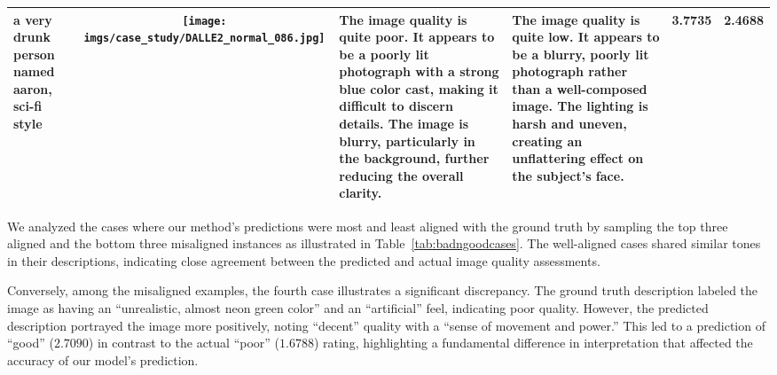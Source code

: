 \begin{table*}
\begin{tabular}{m{2cm}c m{4cm}m{4cm}cc}
        \midrule
        a very drunk person named aaron, sci-fi style & 
        \begin{minipage}{.2\textwidth}
            \texttt{[image: imgs/case\_study/DALLE2\_normal\_086.jpg]}
        \end{minipage} & 
        The image quality is \textcolor{negative}{\textbf{quite poor}}. It appears to be a poorly lit photograph with a strong blue color cast, making it \textcolor{negative}{\textbf{difficult to discern details}}. The image is \textcolor{negative}{\textbf{blurry}}, particularly in the background, further reducing the overall clarity. & 
        The image quality is \textcolor{negative}{\textbf{quite low}}. It appears to be a \textcolor{negative}{\textbf{blurry}}, poorly lit photograph rather than a well-composed image. The lighting is \textcolor{negative}{\textbf{harsh and uneven}}, creating an unflattering effect on the subject's face. &
        3.7735 & 2.4688\\
        \bottomrule
    \end{tabular}
\end{table*}

We analyzed the cases where our method's predictions were most and least aligned with the ground truth by sampling the top three aligned and the bottom three misaligned instances as illustrated in Table~\ref{tab:badngoodcases}. The well-aligned cases shared similar tones in their descriptions, indicating close agreement between the predicted and actual image quality assessments.

Conversely, among the misaligned examples, the fourth case illustrates a significant discrepancy. The ground truth description labeled the image as having an ``unrealistic, almost neon green color'' and an ``artificial'' feel, indicating poor quality. However, the predicted description portrayed the image more positively, noting ``decent'' quality with a ``sense of movement and power.'' This led to a prediction of ``good'' ($2.7090$) in contrast to the actual ``poor'' ($1.6788$) rating, highlighting a fundamental difference in interpretation that affected the accuracy of our model's prediction.

